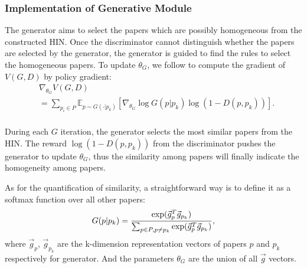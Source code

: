 \documentclass[letterpaper]{article} %
\begin{document}
\subsubsection{Implementation of Generative Module}
The generator aims to select the papers which are possibly homogeneous from the constructed HIN.
Once the discriminator cannot distinguish whether the papers are selected by the generator, the generator is guided to find the rules to select the homogeneous papers.
To update $\theta_G$, we follow \cite{policy1} to compute the gradient of $V(G, D)$ by policy gradient:
\begin{equation}
\begin{split}
&\nabla_{\theta_G} V(G, D) \\
& =  \sum_{p_i \in P}\mathbb{E}_{p \sim G(\cdot|p_k)}[\nabla_{\theta_G}\log G(p|p_k) \log (1-D(p, p_k))].\\
\end{split}
\label{eq:Ggradient}
\end{equation}

During each $G$ iteration, the generator selects the most similar papers from the HIN.
The reward $\log (1-D(p, p_k))$ from the discriminator pushes the generator to update $\theta_G$, thus the similarity among papers will finally indicate the homogeneity among papers.

As for the quantification of similarity, a straightforward way is to define it as a softmax function over all other papers:
\begin{equation}
G(p|p_k)=\frac{\exp(\vec{g}_{p}^T\vec{g}_{p_k})}{\sum_{p \in P, p\neq p_k}\exp(\vec{g}_{p}^T\vec{g}_{p_k})},
\label{eq:g_softmax}
\vspace*{1pt}
\end{equation}
where $\vec{g}_{p}$, $\vec{g}_{p_k}$ are the k-dimension representation vectors of papers $p$ and $p_k$ respectively for generator.
And the parameters $\theta_G$ are the union of all $\vec{g}$ vectors.
\end{document}
